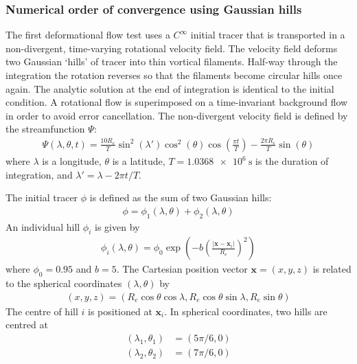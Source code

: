 \subsubsection{Numerical order of convergence using Gaussian hills}
\label{sec:deformationSphere-gaussian-nondiv}

The first deformational flow test uses a $C^\infty$ initial tracer that is transported in a non-divergent, time-varying rotational velocity field.
The velocity field deforms two Gaussian `hills' of tracer into thin vortical filaments.  Half-way through the integration the rotation reverses so that the filaments become circular hills once again.  The analytic solution at the end of integration is identical to the initial condition.
A rotational flow is superimposed on a time-invariant background flow in order to avoid error cancellation.
The non-divergent velocity field is defined by the streamfunction $\Psi$:
\begin{align}
	\Psi(\lambda, \theta, t) = \frac{10 R_e}{T} \sin^2 \left(\lambda'\right) \cos^2 \left(\theta\right) \cos \left( \frac{\pi t}{T} \right) - \frac{2 \pi R_e}{T} \sin\left(\theta\right)
\end{align}
where $\lambda$ is a longitude, $\theta$ is a latitude, $T = \SI{1.0368e6}{\second}$ is the duration of integration, and $\lambda' = \lambda - 2 \pi t / T$.

The initial tracer $\phi$ is defined as the sum of two Gaussian hills:
\begin{align}
	\phi = \phi_1(\lambda, \theta) + \phi_2(\lambda, \theta)
\end{align}
An individual hill $\phi_i$ is given by
\begin{align}
	\phi_i(\lambda, \theta) = \phi_0 \exp\left( -b \left( \frac{|\mathbf{x} - \mathbf{x}_i|}{R_e} \right)^2 \right)
\end{align}
where $\phi_0 = 0.95$ and $b = 5$.  The Cartesian position vector $\mathbf{x} = (x,y,z)$ is related to the spherical coordinates $(\lambda, \theta)$ by
\begin{align}
	(x,y,z) = (R_e \cos \theta \cos \lambda, R_e \cos \theta \sin \lambda, R_e \sin \theta) \label{eqn:spherical-cartesian}
\end{align}
The centre of hill $i$ is positioned at $\mathbf{x}_i$.  In spherical coordinates, two hills are centred at
\begin{align}
	(\lambda_1,\theta_1) &= (5 \pi /6, 0) \\
	(\lambda_2,\theta_2) &= (7 \pi /6, 0)
\end{align}

